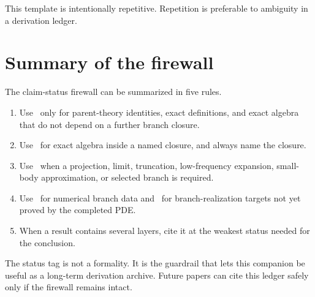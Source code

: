 This template is intentionally repetitive.  Repetition is preferable to ambiguity in a derivation ledger.

\section{Summary of the firewall}
\label{sec:claim-status-summary}

The claim-status firewall can be summarized in five rules.

\begin{enumerate}[leftmargin=2.2em]
  \item Use \StatusExact\ only for parent-theory identities, exact definitions, and exact algebra that do not depend on a further branch closure.
  \item Use \StatusExactClosure\ for exact algebra inside a named closure, and always name the closure.
  \item Use \StatusReduced\ when a projection, limit, truncation, low-frequency expansion, small-body approximation, or selected branch is required.
  \item Use \StatusNumerical\ for numerical branch data and \StatusOpen\ for branch-realization targets not yet proved by the completed PDE.
  \item When a result contains several layers, cite it at the weakest status needed for the conclusion.
\end{enumerate}

The status tag is not a formality.  It is the guardrail that lets this companion be useful as a long-term derivation archive.  Future papers can cite this ledger safely only if the firewall remains intact.
